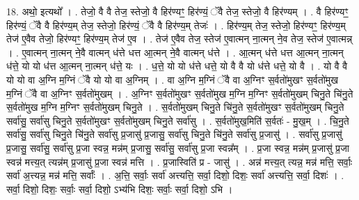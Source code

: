\documentclass[17pt]{extarticle}
\begin{document}
18. अथो॒ इत्यथो᳚ । . तेजो॒ वै वै तेज॒ स्तेजो॒ वै हिर॑ण्यꣳ॒॒ हिर॑ण्यं॒ ॅवै तेज॒ स्तेजो॒ वै हिर॑ण्यम् । . वै हिर॑ण्यꣳ॒॒ हिर॑ण्यं॒ ॅवै वै हिर॑ण्य॒म् तेज॒ स्तेजो॒ हिर॑ण्यं॒ ॅवै वै हिर॑ण्य॒म् तेजः॑ । . हिर॑ण्य॒म् तेज॒ स्तेजो॒ हिर॑ण्यꣳ॒॒ हिर॑ण्य॒म् तेज॑ ए॒वैव तेजो॒ हिर॑ण्यꣳ॒॒ हिर॑ण्य॒म् तेज॑ ए॒व । . तेज॑ ए॒वैव तेज॒ स्तेज॑ ए॒वात्मन् ना॒त्मन् ने॒व तेज॒ स्तेज॑ ए॒वात्मन्न् । . ए॒वात्मन् ना॒त्मन् ने॒वै वात्मन् ध॑त्ते धत्त आ॒त्मन् ने॒वै वात्मन् ध॑त्ते । . आ॒त्मन् ध॑त्ते धत्त आ॒त्मन् ना॒त्मन् ध॑त्ते॒ यो यो ध॑त्त आ॒त्मन् ना॒त्मन् ध॑त्ते॒ यः । . ध॒त्ते॒ यो यो ध॑त्ते धत्ते॒ यो वै वै यो ध॑त्ते धत्ते॒ यो वै । . यो वै वै यो यो वा अ॒ग्नि म॒ग्निं ॅवै यो यो वा अ॒ग्निम् । . वा अ॒ग्नि म॒ग्निं ॅवै वा अ॒ग्निꣳ स॒र्वतो॑मुखꣳ स॒र्वतो॑मुख म॒ग्निं ॅवै वा अ॒ग्निꣳ स॒र्वतो॑मुखम् । . अ॒ग्निꣳ स॒र्वतो॑मुखꣳ स॒र्वतो॑मुख म॒ग्नि म॒ग्निꣳ स॒र्वतो॑मुखम् चिनु॒ते चि॑नु॒ते स॒र्वतो॑मुख म॒ग्नि म॒ग्निꣳ स॒र्वतो॑मुखम् चिनु॒ते । . स॒र्वतो॑मुखम् चिनु॒ते चि॑नु॒ते स॒र्वतो॑मुखꣳ स॒र्वतो॑मुखम् चिनु॒ते सर्वा॑सु॒ सर्वा॑सु चिनु॒ते स॒र्वतो॑मुखꣳ स॒र्वतो॑मुखम् चिनु॒ते सर्वा॑सु । . स॒र्वतो॑मुख॒मिति॑ स॒र्वतः॑ - मु॒ख॒म् । . चि॒नु॒ते सर्वा॑सु॒ सर्वा॑सु चिनु॒ते चि॑नु॒ते सर्वा॑सु प्र॒जासु॑ प्र॒जासु॒ सर्वा॑सु चिनु॒ते चि॑नु॒ते सर्वा॑सु प्र॒जासु॑ । . सर्वा॑सु प्र॒जासु॑ प्र॒जासु॒ सर्वा॑सु॒ सर्वा॑सु प्र॒जा स्वन्न॒ मन्न॑म् प्र॒जासु॒ सर्वा॑सु॒ सर्वा॑सु प्र॒जा स्वन्न᳚म् । . प्र॒जा स्वन्न॒ मन्न॑म् प्र॒जासु॑ प्र॒जा स्वन्न॑ मत्त्य॒त् त्यन्न॑म् प्र॒जासु॑ प्र॒जा स्वन्न॑ मत्ति । . प्र॒जास्विति॑ प्र - जासु॑ । . अन्न॑ मत्त्य॒त् त्यन्न॒ मन्न॑ मत्ति॒ सर्वाः॒ सर्वा॑ अ॒त्त्यन्न॒ मन्न॑ मत्ति॒ सर्वाः᳚ । . अ॒त्ति॒ सर्वाः॒ सर्वा॑ अत्त्यत्ति॒ सर्वा॒ दिशो॒ दिशः॒ सर्वा॑ अत्त्यत्ति॒ सर्वा॒ दिशः॑ । . सर्वा॒ दिशो॒ दिशः॒ सर्वाः॒ सर्वा॒ दिशो॒ ऽभ्य॑भि दिशः॒ सर्वाः॒ सर्वा॒ दिशो॒ ऽभि । \newline
\end{document}
